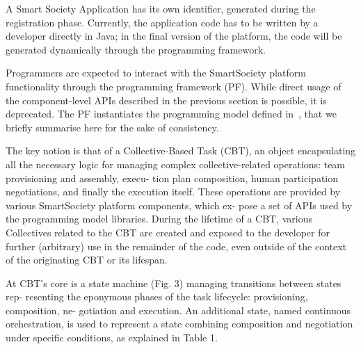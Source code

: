 A Smart Society Application has its own identifier, generated during the registration phase. Currently, the application code has to be written by a developer directly in Java; in the final version of the platform, the code will be generated dynamically through the programming framework. %


Programmers are expected to interact with the SmartSociety platform functionality through the programming framework (PF). While direct usage of the component-level APIs described in the previous section is possible, it is deprecated. The PF instantiates the programming model defined in~\cite{D7.2}, that we briefly summarise here for the sake of consistency. 



The key notion is that of a Collective-Based Task (CBT), an object encapsulating all the necessary logic for managing complex collective-related operations: team provisioning and assembly, execu- tion plan composition, human participation negotiations, and finally the execution itself. These operations are provided by various SmartSociety platform components, which ex- pose a set of APIs used by the programming model libraries. During the lifetime of a CBT, various Collectives related to the CBT are created and exposed to the developer for further (arbitrary) use in the remainder of the code, even outside of the context of the originating CBT or its lifespan. 

At CBT’s core is a state machine (Fig. 3) managing transitions between states rep- resenting the eponymous phases of the task lifecycle: provisioning, composition, ne- gotiation and execution. An additional state, named continuous orchestration, is used to represent a state combining composition and negotiation under specific conditions, as explained in Table 1.


